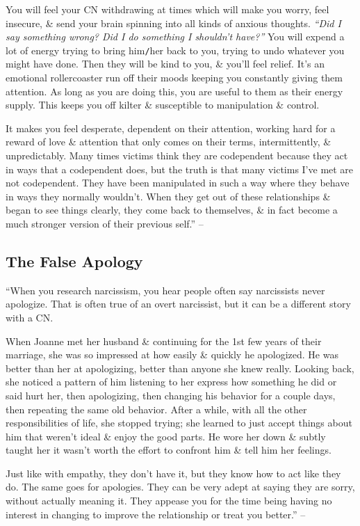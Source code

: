 \documentclass{article}
\numberwithin{equation}{section}
\begin{document}
You will feel your CN withdrawing at times which will make you worry, feel insecure, \& send your brain spinning into all kinds of anxious thoughts. \textit{``Did I say something wrong? Did I do something I shouldn't have?''} You will expend a lot of energy trying to bring him\texttt{/}her back to you, trying to undo whatever you might have done. Then they will be kind to you, \& you'll feel relief. It's an emotional rollercoaster run off their moods keeping you constantly giving them attention. As long as you are doing this, you are useful to them as their energy supply. This keeps you off kilter \& susceptible to manipulation \& control.

It makes you feel desperate, dependent on their attention, working hard for a reward of love \& attention that only comes on their terms, intermittently, \& unpredictably. Many times victims think they are codependent because they act in ways that a codependent does, but the truth is that many victims I've met are not codependent. They have been manipulated in such a way where they behave in ways they normally wouldn't. When they get out of these relationships \& began to see things clearly, they come back to themselves, \& in fact become a much stronger version of their previous self.'' -- \cite[pp. 78--80]{Mirza2017}

\subsection{The False Apology}
``When you research narcissism, you hear people often say narcissists never apologize. That is often true of an overt narcissist, but it can be a different story with a CN.

When Joanne met her husband \& continuing for the 1st few years of their marriage, she was so impressed at how easily \& quickly he apologized. He was better than her at apologizing, better than anyone she knew really. Looking back, she noticed a pattern of him listening to her express how something he did or said hurt her, then apologizing, then changing his behavior for a couple days, then repeating the same old behavior. After a while, with all the other responsibilities of life, she stopped trying; she learned to just accept things about him that weren't ideal \& enjoy the good parts. He wore her down \& subtly taught her it wasn't worth the effort to confront him \& tell him her feelings.

Just like with empathy, they don't have it, but they know how to act like they do. The same goes for apologies. They can be very adept at saying they are sorry, without actually meaning it. They appease you for the time being having no interest in changing to improve the relationship or treat you better.'' -- \cite[p. 80]{Mirza2017}
\end{document}

